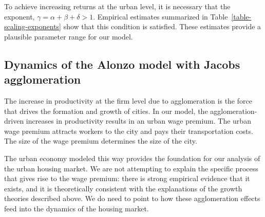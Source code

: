To achieve increasing returns at the urban level, it is necessary that the exponent, $\gamma=\alpha+ \beta + \delta > 1$.  Empirical  estimates summarized in Table~\ref{table-scaling-exponents} show that this condition is satisfied. These estimates provide a plausible parameter range for our model. 


% 
% 
\subsection{Dynamics of the Alonzo model with Jacobs agglomeration}
The increase in productivity at the firm level due to agglomeration is the force that drives the formation and growth of cities. In our model, the agglomeration-driven increases in productivity results in an \gls{urban wage premium}. The urban wage premium attracts workers to the city and pays their  transportation costs. The size of the wage premium determines the size of the city.

The urban economy modeled this way provides the foundation for our analysis of the urban housing market. We are not attempting to explain the specific process that gives rise to the wage premium: there is strong empirical evidence that it exists, and it is theoretically consistent with the explanations of the growth theories described above. We do need to point to how these agglomeration effects feed into the dynamics of the housing market.


